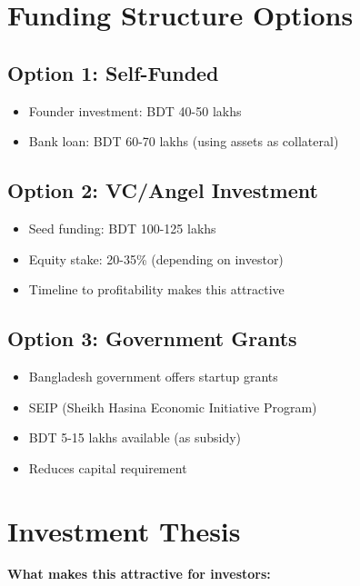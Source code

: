 \section{Funding Structure Options}

\subsection{Option 1: Self-Funded}
\begin{itemize}
    \item Founder investment: BDT 40-50 lakhs
    \item Bank loan: BDT 60-70 lakhs (using assets as collateral)
\end{itemize}

\subsection{Option 2: VC/Angel Investment}
\begin{itemize}
    \item Seed funding: BDT 100-125 lakhs
    \item Equity stake: 20-35\% (depending on investor)
    \item Timeline to profitability makes this attractive
\end{itemize}

\subsection{Option 3: Government Grants}
\begin{itemize}
    \item Bangladesh government offers startup grants
    \item SEIP (Sheikh Hasina Economic Initiative Program)
    \item BDT 5-15 lakhs available (as subsidy)
    \item Reduces capital requirement
\end{itemize}

\section{Investment Thesis}

\textcolor{SecondaryBlue}{\textbf{What makes this attractive for investors:}}

